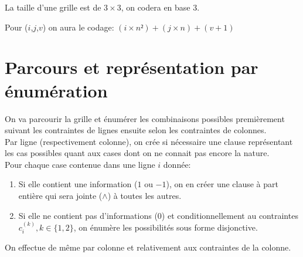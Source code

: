 \documentclass[a4paper,12pt]{report}
\begin{document}
La taille d'une grille est de $3\times3$, on codera en base 3.


Pour ($i$,$j$,$v$) on aura le codage: $(i \times n²)+(j \times n)+(v+1)$


\section{Parcours et représentation par énumération}


On va parcourir la grille et énumérer les combinaisons possibles premièrement suivant les contraintes de lignes ensuite selon les contraintes de colonnes.\\ 

Par ligne (respectivement colonne), on crée si nécessaire une clause représentant les cas possibles quant aux cases dont on ne connait pas encore la nature.\\

Pour chaque case contenue dans une ligne $i$ donnée:
\begin{enumerate}
\item Si elle contient une information ($1$ ou $-1$), on en créer une clause à part entière qui sera jointe ($\wedge$) à toutes les autres.
\item Si elle ne contient pas d'informations ($0$) et conditionnellement au contraintes $c_i^{(k)}, k\in\{1,2\}$, on énumère les possibilités sous forme disjonctive.
\end{enumerate}
On effectue de même par colonne et relativement aux contraintes de la colonne.\\


%
\end{document}

